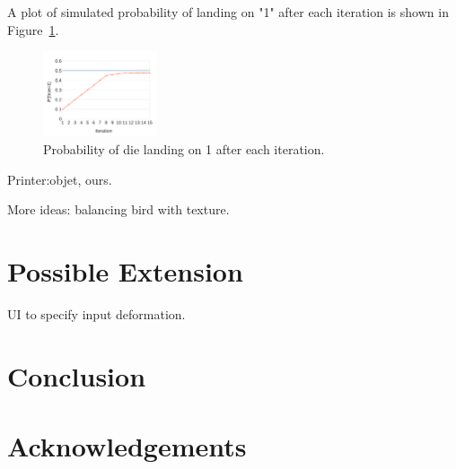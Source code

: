 \documentclass[annual]{acmsiggraph}
\begin{document}
A plot of simulated probability of landing on "1" after each iteration
is shown in Figure~\ref{fig:dieErr}.

\begin{figure}
	\centering
 	\includegraphics[width=0.3\textwidth]{figure/die.pdf}
\caption{Probability of die landing on 1 after each iteration.}
\label{fig:dieErr}
\end{figure}

Printer:objet, ours.

More ideas:
balancing bird with texture.
\section{Possible Extension}
UI to specify input deformation.
\section{Conclusion}
\section*{Acknowledgements}



\end{document}
